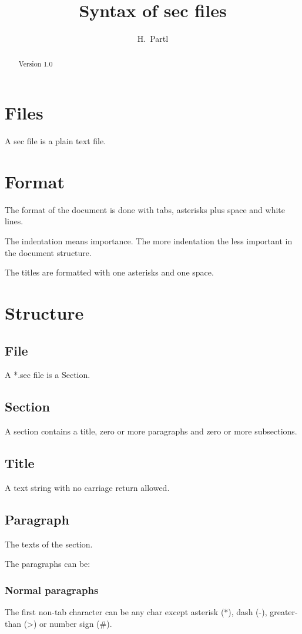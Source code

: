\documentclass[a4paper,11pt]{article}
\author{H.~Partl}
\title{Syntax of sec files}
\begin{document}
\maketitle
\tableofcontents
\begin{abstract}
Version 1.0

\end{abstract}
\section{Files}
A sec file is a plain text file.

\section{Format}
The format of the document is done with tabs, asterisks plus space and
white lines.

The indentation means importance. The more indentation the less 
important in the document structure.

The titles are formatted with one asterisks and one space.

\section{Structure}
\subsection{File}
A *.sec file is a Section.

\subsection{Section}
A section contains a title, zero or more paragraphs and zero or 
more subsections.

\subsection{Title}
A text string with no carriage return allowed.

\subsection{Paragraph}
The texts of the section.

The paragraphs can be:

\subsubsection{Normal paragraphs}
The first non-tab character can be any char except 
asterisk (*), dash (-), greater-than (>) or number sign (#).
\end{document}
